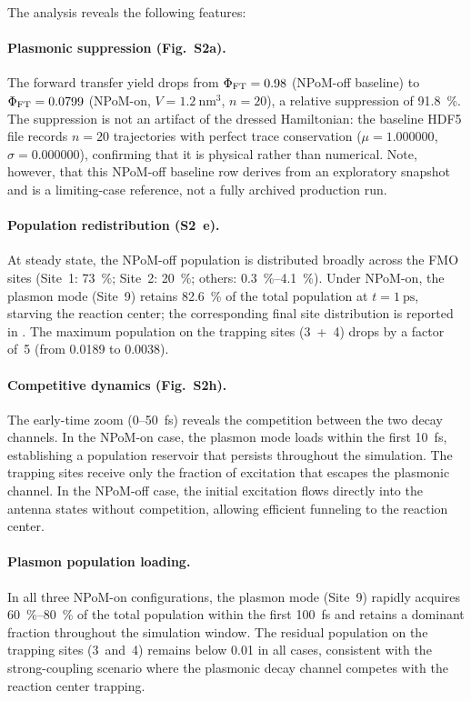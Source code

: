 \documentclass[11pt,a4paper]{article}
\begin{document}
The analysis reveals the following features:

\paragraph{Plasmonic suppression (Fig.~S2a).} The forward transfer yield drops from $\Phi_{\rm FT} =\num{0.98}$ (NPoM-off baseline) to $\Phi_{\rm FT} = \num{0.0799}$ (NPoM-on, $V = \qty{1.2}{\nm\cubed}$, $n=20$), a relative suppression of \qty{91.8}{\percent}. The suppression is not an artifact of the dressed Hamiltonian: the baseline HDF5 file records $n=20$ trajectories with perfect trace conservation ($\mu =\num{1.000000}$, $\sigma =\num{0.000000}$), confirming that it is physical rather than numerical. Note, however, that this NPoM-off baseline row derives from an exploratory snapshot and is a limiting-case reference, not a fully archived production run.

\paragraph{Population redistribution (S2~e).} At steady state, the NPoM-off population is distributed broadly across the FMO sites (Site~1: \qty{73}{\percent}; Site~2: \qty{20}{\percent}; others: \qtyrange{0.3}{4.1}{\percent}). Under NPoM-on, the plasmon mode (Site~9) retains \qty{82.6}{\percent} of the total population at $t = \qty{1}{\ps}$, starving the reaction center; the corresponding final site distribution is reported in . The maximum population on the trapping sites (3~+~4) drops by a factor of~5 (from \num{0.0189} to \num{0.0038}).

\paragraph{Competitive dynamics (Fig.~S2h).} The early-time zoom (0--\qty{50}{\fs}) reveals the competition between the two decay channels. In the NPoM-on case, the plasmon mode loads within the first \qty{10}{\fs}, establishing a population reservoir that persists throughout the simulation. The trapping sites receive only the fraction of excitation that escapes the plasmonic channel. In the NPoM-off case, the initial excitation flows directly into the antenna states without competition, allowing efficient funneling to the reaction center.

\paragraph{Plasmon population loading.} In all three NPoM-on configurations, the plasmon mode (Site~9) rapidly acquires \qty{60}{\percent}--\qty{80}{\percent} of the total population within the first \qty{100}{\fs} and retains a dominant fraction throughout the simulation window. The residual population on the trapping sites (3~and~4) remains below \num{0.01} in all cases, consistent with the strong-coupling scenario where the plasmonic decay channel competes with the reaction center trapping.
\end{document}
